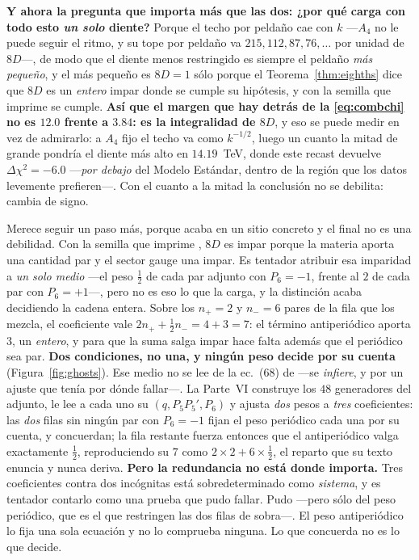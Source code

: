 \documentclass[11pt,a4paper]{article}
\begin{document}
\noindent\textbf{Y ahora la pregunta que importa más que las dos: ¿por qué carga con todo esto
\emph{un solo} diente?} Porque el techo por peldaño cae con $k$ ---$A_4$ no le puede seguir el
ritmo, y su tope por peldaño va $215,112,87,76,\dots$ por unidad de $8D$---, de modo que el diente
menos restringido es siempre el peldaño \emph{más pequeño}, y el más pequeño es $8D=1$ sólo porque
el Teorema~\ref{thm:eighths} dice que $8D$ es un \emph{entero} impar donde se cumple su hipótesis,
y con la semilla que imprime \cite{KM25} se cumple. \textbf{Así que el margen que
hay detrás de la \eqref{eq:combchi} no es $12.0$ frente a $3.84$: es la integralidad de $8D$}, y eso
se puede medir en vez de admirarlo: a $A_4$ fijo el techo va como $k^{-1/2}$, luego un cuanto la
mitad de grande pondría el diente más alto en $14.19$~TeV, donde este recast devuelve
$\Delta\chi^2=-6.0$ ---\emph{por debajo} del Modelo Estándar, dentro de la región que los datos
levemente prefieren---. Con el cuanto a la mitad la conclusión no se debilita: cambia de signo.

\noindent Merece seguir un paso más, porque acaba en un sitio concreto y el final no es una
debilidad. Con la semilla que imprime \cite{KM25}, $8D$ es impar porque la materia aporta una
cantidad par y el sector gauge una impar. Es
tentador atribuir esa imparidad a \emph{un solo medio} ---el peso $\tfrac12$ de cada par adjunto
con $P_6=-1$, frente al $2$ de cada par con $P_6=+1$---, pero no es eso lo que la carga, y la
distinción acaba decidiendo la cadena entera. Sobre los $n_+=2$ y $n_-=6$ pares de la fila que los
mezcla, el coeficiente vale $2n_++\tfrac12 n_-=4+3=7$: el término antiperiódico aporta $3$, un
\emph{entero}, y para que la suma salga impar hace falta además que el periódico sea par.
\textbf{Dos condiciones, no una, y ningún peso decide por su cuenta}
(Figura~\ref{fig:ghosts}). Ese medio no se lee de la ec.~(68)
de \cite{KM25} ---se \emph{infiere}, y por un ajuste que tenía por dónde fallar---. La Parte~VI
\cite{PartVI} construye los $48$ generadores del adjunto, le lee a cada uno su $(q,P_5P_5',P_6)$ y
ajusta \emph{dos} pesos a \emph{tres} coeficientes: las \emph{dos} filas sin ningún par con
$P_6=-1$ fijan el peso periódico cada una por su cuenta, y concuerdan; la fila restante fuerza
entonces que el antiperiódico valga exactamente $\tfrac12$, reproduciendo su $7$ como
$2\times2+6\times\tfrac12$, el reparto que su texto enuncia y nunca deriva. \textbf{Pero la
redundancia no está donde importa.} Tres coeficientes contra dos incógnitas está sobredeterminado
como \emph{sistema}, y es tentador contarlo como una prueba que pudo fallar. Pudo ---pero sólo del
peso periódico, que es el que restringen las dos filas de sobra---. El peso antiperiódico lo fija
una sola ecuación y no lo comprueba ninguna. Lo que concuerda no es lo que decide.
\end{document}
